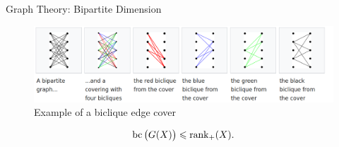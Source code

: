 \begin{frame}{Graph Theory: Bipartite Dimension}

\begin{figure}
\centering
\includegraphics[scale=0.2]{../images/biclique.png}
\caption{Example of a biclique edge cover}
\end{figure}
\begin{thm}
\[
\operatorname{bc}\big(G(X)\big)\leqslant \operatorname{rank}_+(X).
\]
\end{thm}
\end{frame}

